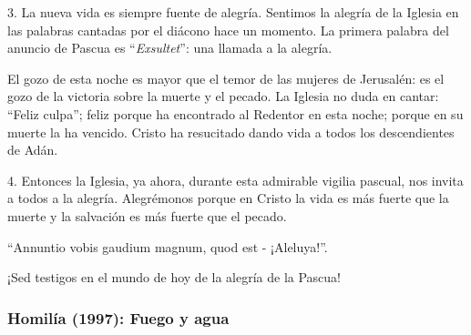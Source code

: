 			\begin{body}\begin{bodysmall}\end{bodysmall}\end{body}
			
			\begin{body}3. La nueva vida es siempre fuente de alegría. Sentimos la alegría de la Iglesia en las palabras cantadas por el diácono hace un momento. La primera palabra del anuncio de Pascua es “\textit{Exsultet}”: una llamada a la alegría. \end{body}
			
			\begin{body}El gozo de esta noche es mayor que el temor de las mujeres de Jerusalén: es el gozo de la victoria sobre la muerte y el pecado. La Iglesia no duda en cantar: “Feliz culpa”; feliz porque ha encontrado al Redentor en esta noche; porque en su muerte la ha vencido. Cristo ha resucitado dando vida a todos los descendientes de Adán. \end{body}
			
			\begin{body}4. Entonces la Iglesia, ya ahora, durante esta admirable vigilia pascual, nos invita a todos a la alegría. Alegrémonos porque en Cristo la vida es más fuerte que la muerte y la salvación es más fuerte que el pecado.\end{body}
			
			\begin{body}“Annuntio vobis gaudium magnum, quod est - ¡Aleluya!”. \end{body}
			
			\begin{body}¡Sed testigos en el mundo de hoy de la alegría de la Pascua!\end{body}
			
			\subsubsection{Homilía (1997): Fuego y agua}
			
